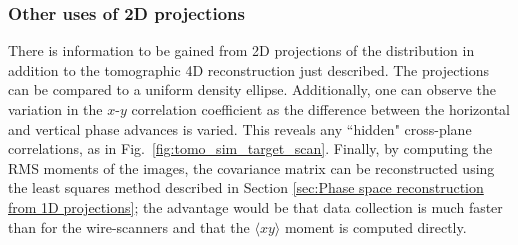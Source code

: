 \subsubsection{Other uses of 2D projections}

There is information to be gained from 2D projections of the distribution in addition to the tomographic 4D reconstruction just described. The projections can be compared to a uniform density ellipse. Additionally, one can observe the variation in the $x$-$y$ correlation coefficient as the difference between the horizontal and vertical phase advances is varied. This reveals any ``hidden" cross-plane correlations, as in Fig.~\ref{fig:tomo_sim_target_scan}. Finally, by computing the RMS moments of the images, the covariance matrix can be reconstructed using the least squares method described in Section \ref{sec:Phase space reconstruction from 1D projections}; the advantage would be that data collection is much faster than for the wire-scanners and that the $\langle xy \rangle$ moment is computed directly.